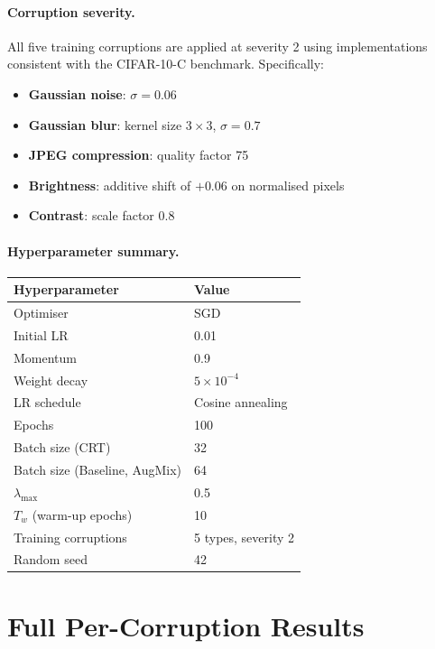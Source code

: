 \documentclass[10pt,twocolumn]{article}
\begin{document}
\paragraph{Corruption severity.} All five training corruptions are applied at severity 2 using implementations consistent with the CIFAR-10-C benchmark. Specifically:
\begin{itemize}[leftmargin=*, topsep=2pt, itemsep=1pt]
  \item \textbf{Gaussian noise}: $\sigma = 0.06$
  \item \textbf{Gaussian blur}: kernel size $3 \times 3$, $\sigma = 0.7$
  \item \textbf{JPEG compression}: quality factor 75
  \item \textbf{Brightness}: additive shift of $+0.06$ on normalised pixels
  \item \textbf{Contrast}: scale factor $0.8$
\end{itemize}

\paragraph{Hyperparameter summary.}
\begin{center}
\begin{tabular}{ll}
\toprule
Hyperparameter & Value \\
\midrule
Optimiser & SGD \\
Initial LR & 0.01 \\
Momentum & 0.9 \\
Weight decay & $5 \times 10^{-4}$ \\
LR schedule & Cosine annealing \\
Epochs & 100 \\
Batch size (CRT) & 32 \\
Batch size (Baseline, AugMix) & 64 \\
$\lambda_{\max}$ & 0.5 \\
$T_w$ (warm-up epochs) & 10 \\
Training corruptions & 5 types, severity 2 \\
Random seed & 42 \\
\bottomrule
\end{tabular}
\end{center} 

\section{Full Per-Corruption Results}
\label{app:full_results}
\end{document}
